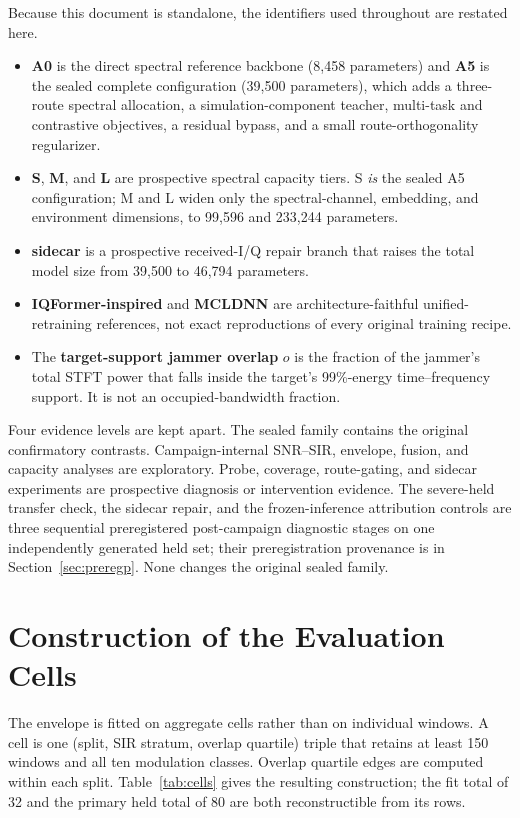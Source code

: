 \documentclass[letterpaper,onecolumn,11pt,journal]{IEEEtran}
\begin{document}
Because this document is standalone, the identifiers used throughout are
restated here.
\begin{itemize}
  \item \textbf{A0} is the direct spectral reference backbone (8{,}458
  parameters) and \textbf{A5} is the sealed complete configuration
  (39{,}500 parameters), which adds a three-route spectral allocation, a
  simulation-component teacher, multi-task and contrastive objectives, a
  residual bypass, and a small route-orthogonality regularizer.
  \item \textbf{S}, \textbf{M}, and \textbf{L} are prospective spectral
  capacity tiers. S \emph{is} the sealed A5 configuration; M and L widen only
  the spectral-channel, embedding, and environment dimensions, to
  99{,}596 and 233{,}244 parameters.
  \item \textbf{sidecar} is a prospective received-I/Q repair branch that
  raises the total model size from 39{,}500 to 46{,}794 parameters.
  \item \textbf{IQFormer-inspired} and \textbf{MCLDNN} are
  architecture-faithful unified-retraining references, not exact reproductions
  of every original training recipe.
  \item The \textbf{target-support jammer overlap} $o$ is the fraction of the
  jammer's total STFT power that falls inside the target's 99\%-energy
  time--frequency support. It is not an occupied-bandwidth fraction.
\end{itemize}

Four evidence levels are kept apart. The sealed family contains the original
confirmatory contrasts. Campaign-internal SNR--SIR, envelope, fusion, and
capacity analyses are exploratory. Probe, coverage, route-gating, and sidecar
experiments are prospective diagnosis or intervention evidence. The severe-held
transfer check, the sidecar repair, and the frozen-inference attribution
controls are three sequential preregistered post-campaign diagnostic stages on
one independently generated held set; their preregistration provenance is in
Section~\ref{sec:preregp}. None changes the original sealed family.

\section{Construction of the Evaluation Cells}
The envelope is fitted on aggregate cells rather than on individual windows. A
cell is one (split, SIR stratum, overlap quartile) triple that retains at least
150 windows and all ten modulation classes. Overlap quartile edges are computed
within each split. Table~\ref{tab:cells} gives the resulting construction; the
fit total of 32 and the primary held total of 80 are both reconstructible from
its rows.
\end{document}
